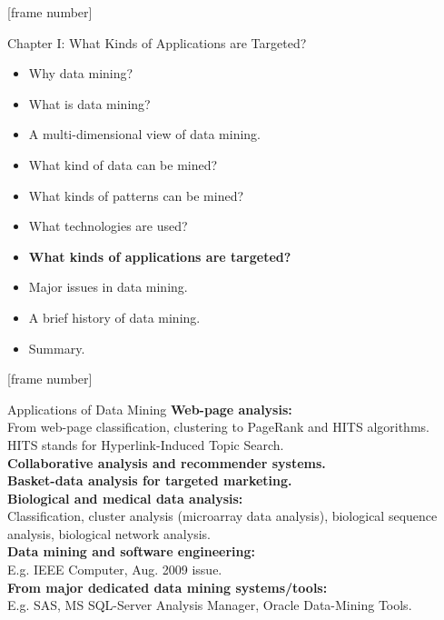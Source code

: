 \documentclass[aspectratio=169,t]{beamer}
\begin{document}
  {
    [frame number]
    \begin{frame}{Chapter I: What Kinds of Applications are Targeted?}
        \begin{itemize}
            \item Why data mining?
            \item What is data mining?
            \item A multi-dimensional view of data mining.
            \item What kind of data can be mined?
            \item What kinds of patterns can be mined?
            \item What technologies are used?
            \item \textbf{What kinds of applications are targeted?}
            \item Major issues in data mining.
            \item A brief history of data mining.
            \item Summary.
        \end{itemize}
    \end{frame}
  }

  {
    [frame number]
    \begin{frame}{Applications of Data Mining}
    \textbf{Web-page analysis:}\\
    From web-page classification, clustering to PageRank and HITS algorithms.\\
    HITS stands for Hyperlink-Induced Topic Search.\\[0.2cm]
    \textbf{Collaborative analysis and recommender systems.}\\
    \textbf{Basket-data analysis for targeted marketing.}\\
    \textbf{Biological and medical data analysis:}\\
    Classification, cluster analysis (microarray data analysis), biological sequence analysis, biological network analysis.\\[0.2cm]
    \textbf{Data mining and software engineering:}\\
    E.g. IEEE Computer, Aug. 2009 issue.\\
    \textbf{From major dedicated data mining systems/tools:}\\
    E.g. SAS, MS SQL-Server Analysis Manager, Oracle Data-Mining Tools.
    \end{frame}
  }
\end{document}
